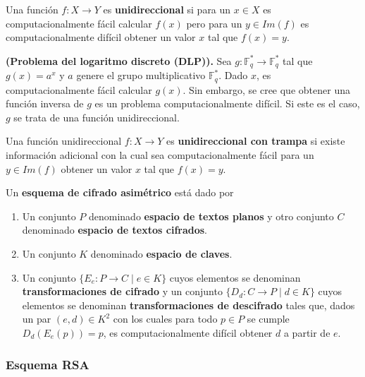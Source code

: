 \begin{definition}
	Una función $f : X \rightarrow Y$ es \textbf{unidireccional} si para un $x \in X$ es computacionalmente fácil calcular $f(x)$ pero para un $y \in Im(f)$ es computacionalmente difícil obtener un valor $x$ tal que $f(x) = y$.
\end{definition}

\begin{example} \textbf{(Problema del logaritmo discreto (DLP)).}
	Sea $g : \mathbb{F}_q^* \rightarrow \mathbb{F}_q^*$ tal que $g(x) = a^x$ y $a$ genere el grupo multiplicativo $\mathbb{F}_q^*$. Dado $x$, es computacionalmente fácil calcular $g(x)$. Sin embargo, se cree que obtener una función inversa de $g$ es un problema computacionalmente difícil. Si este es el caso, $g$ se trata de una función unidireccional.
\end{example}

\begin{definition}
	Una función unidireccional $f : X \rightarrow Y$ es \textbf{unidireccional con trampa} si existe información adicional con la cual sea computacionalmente fácil para un $y \in Im(f)$ obtener un valor $x$ tal que $f(x) = y$.
\end{definition}

\begin{definition}
	Un \textbf{esquema de cifrado asimétrico} está dado por
	\begin{enumerate}
		\item Un conjunto $P$ denominado \textbf{espacio de textos planos} y otro conjunto $C$ denominado \textbf{espacio de textos cifrados}.
		\item Un conjunto $K$ denominado \textbf{espacio de claves}.
		\item Un conjunto $\{E_e : P \rightarrow C \mid e \in K\}$ cuyos elementos se denominan \textbf{transformaciones de cifrado} y un conjunto $\{D_d : C \rightarrow P \mid d \in K\}$ cuyos elementos se denominan \textbf{transformaciones de descifrado} tales que, dados un par $(e, d) \in K^2$ con los cuales para todo $p \in P$ se cumple $D_d(E_e(p)) = p$, es computacionalmente difícil obtener $d$ a partir de $e$.
	\end{enumerate}
\end{definition}

\subsubsection{Esquema RSA}

